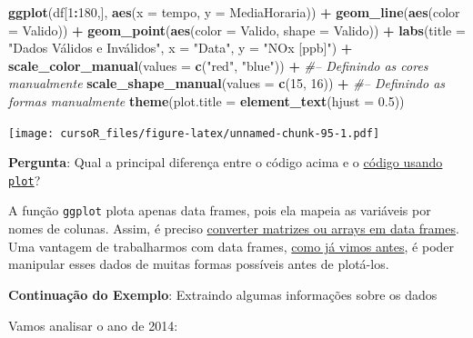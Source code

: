 \documentclass[]{book}
\newenvironment{Shaded}{\begin{snugshade}}{\end{snugshade}}
\newcommand{\KeywordTok}[1]{\textcolor[rgb]{0.13,0.29,0.53}{\textbf{#1}}}
\newcommand{\DataTypeTok}[1]{\textcolor[rgb]{0.13,0.29,0.53}{#1}}
\newcommand{\DecValTok}[1]{\textcolor[rgb]{0.00,0.00,0.81}{#1}}
\newcommand{\FloatTok}[1]{\textcolor[rgb]{0.00,0.00,0.81}{#1}}
\newcommand{\StringTok}[1]{\textcolor[rgb]{0.31,0.60,0.02}{#1}}
\newcommand{\CommentTok}[1]{\textcolor[rgb]{0.56,0.35,0.01}{\textit{#1}}}
\newcommand{\OperatorTok}[1]{\textcolor[rgb]{0.81,0.36,0.00}{\textbf{#1}}}
\newcommand{\NormalTok}[1]{#1}
\theoremstyle{definition}
\theoremstyle{definition}
\theoremstyle{definition}
\theoremstyle{remark}
\begin{document}
\begin{Shaded}
\begin{Highlighting}[]
\KeywordTok{ggplot}\NormalTok{(df[}\DecValTok{1}\OperatorTok{:}\DecValTok{180}\NormalTok{,], }\KeywordTok{aes}\NormalTok{(}\DataTypeTok{x =}\NormalTok{ tempo, }\DataTypeTok{y =}\NormalTok{ MediaHoraria)) }\OperatorTok{+}\StringTok{ }
\StringTok{  }\KeywordTok{geom_line}\NormalTok{(}\KeywordTok{aes}\NormalTok{(}\DataTypeTok{color =}\NormalTok{ Valido)) }\OperatorTok{+}
\StringTok{  }\KeywordTok{geom_point}\NormalTok{(}\KeywordTok{aes}\NormalTok{(}\DataTypeTok{color =}\NormalTok{ Valido, }\DataTypeTok{shape =}\NormalTok{ Valido)) }\OperatorTok{+}
\StringTok{  }\KeywordTok{labs}\NormalTok{(}\DataTypeTok{title =} \StringTok{"Dados Válidos e Inválidos"}\NormalTok{, }\DataTypeTok{x =} \StringTok{"Data"}\NormalTok{, }\DataTypeTok{y =} \StringTok{"NOx [ppb]"}\NormalTok{) }\OperatorTok{+}
\StringTok{  }\KeywordTok{scale_color_manual}\NormalTok{(}\DataTypeTok{values =} \KeywordTok{c}\NormalTok{(}\StringTok{"red"}\NormalTok{, }\StringTok{"blue"}\NormalTok{)) }\OperatorTok{+}\StringTok{ }\CommentTok{#-- Definindo as cores manualmente}
\StringTok{  }\KeywordTok{scale_shape_manual}\NormalTok{(}\DataTypeTok{values =} \KeywordTok{c}\NormalTok{(}\DecValTok{15}\NormalTok{, }\DecValTok{16}\NormalTok{)) }\OperatorTok{+}\StringTok{ }\CommentTok{#-- Definindo as formas manualmente}
\StringTok{  }\KeywordTok{theme}\NormalTok{(}\DataTypeTok{plot.title =} \KeywordTok{element_text}\NormalTok{(}\DataTypeTok{hjust =} \FloatTok{0.5}\NormalTok{))}
\end{Highlighting}
\end{Shaded}

\texttt{[image: cursoR\_files/figure-latex/unnamed-chunk-95-1.pdf]}

{\textbf{Pergunta}: Qual a principal diferença entre o código acima e o
\protect\hyperlink{plot_base}{código usando \texttt{plot}}?}

A função \texttt{ggplot} plota apenas data frames, pois ela mapeia as
variáveis por nomes de colunas. Assim, é preciso
\protect\hyperlink{convert_df}{converter matrizes ou arrays em data
frames}.\\
Uma vantagem de trabalharmos com data frames,
\protect\hyperlink{processing_dfs}{como já vimos antes}, é poder
manipular esses dados de muitas formas possíveis antes de plotá-los.

\textbf{Continuação do Exemplo}: Extraindo algumas informações sobre os
dados

Vamos analisar o ano de 2014:
\end{document}
